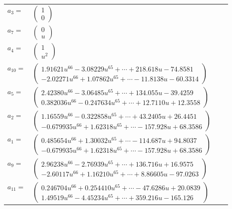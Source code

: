 \documentclass[1p]{elsarticle_modified}
\theoremstyle{definition}
\begin{document}
\begin{tabular}{m{7pt} m{180pt} m{7pt} m{180pt} }
\flushright $a_{3}=$&$\begin{pmatrix}1\\0\end{pmatrix}$ \\
\flushright $a_{7}=$&$\begin{pmatrix}0\\u\end{pmatrix}$ \\
\flushright $a_{4}=$&$\begin{pmatrix}1\\u^2\end{pmatrix}$ \\
\flushright $a_{10}=$&$\begin{pmatrix}1.91621 u^{66}-3.08229 u^{65}+\cdots+218.618 u-74.8581\\-2.02271 u^{66}+1.07862 u^{65}+\cdots-11.8138 u-60.3314\end{pmatrix}$ \\
\flushright $a_{5}=$&$\begin{pmatrix}2.42380 u^{66}-3.06485 u^{65}+\cdots+134.055 u-39.4259\\0.382036 u^{66}-0.247634 u^{65}+\cdots+12.7110 u+12.3558\end{pmatrix}$ \\
\flushright $a_{2}=$&$\begin{pmatrix}1.16559 u^{66}-0.322858 u^{65}+\cdots+43.2405 u+26.4451\\-0.679935 u^{66}+1.62318 u^{65}+\cdots-157.928 u+68.3586\end{pmatrix}$ \\
\flushright $a_{1}=$&$\begin{pmatrix}0.485654 u^{66}+1.30032 u^{65}+\cdots-114.687 u+94.8037\\-0.679935 u^{66}+1.62318 u^{65}+\cdots-157.928 u+68.3586\end{pmatrix}$ \\
\flushright $a_{9}=$&$\begin{pmatrix}2.96238 u^{66}-2.76939 u^{65}+\cdots+136.716 u+16.9575\\-2.60117 u^{66}+1.16210 u^{65}+\cdots+8.86605 u-97.0263\end{pmatrix}$ \\
\flushright $a_{11}=$&$\begin{pmatrix}0.246704 u^{66}+0.254410 u^{65}+\cdots-47.6286 u+20.0839\\1.49519 u^{66}-4.45234 u^{65}+\cdots+359.216 u-165.126\end{pmatrix}$ \\

\end{tabular}
\end{document}
